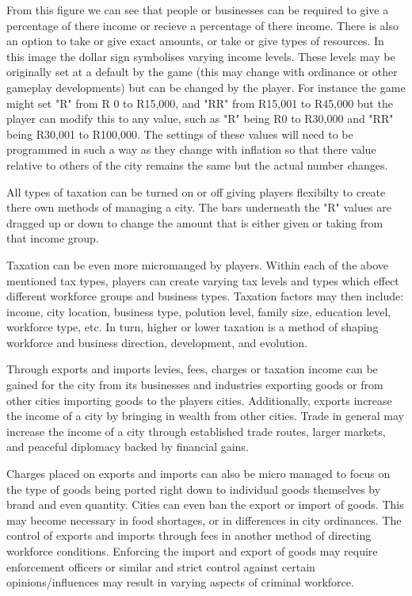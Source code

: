 
From this figure we can see that people or businesses can be required to give a percentage of there income or recieve a percentage of there income. There is also an option to take or give exact amounts, or take or give types of resources. In this image the dollar sign symbolises varying income levels. These levels may be originally set at a default by the game (this may change with ordinance or other gameplay developments) but can be changed by the player. For instance the game might set "R" from R 0 to R15,000, and "RR" from R15,001 to R45,000 but the player can modify this to any value, such as "R" being R0 to R30,000 and "RR" being R30,001 to R100,000. The settings of these values will need to be programmed in such a way as they change with inflation so that there value relative to others of the city remains the same but the actual number changes.

All types of taxation can be turned on or off giving players flexibilty to create there own methods of managing a city. The bars underneath the "R" values are dragged up or down to change the amount that is either given or taking from that income group.  


Taxation can be even more micromanged by players. Within each of the above mentioned tax types, players can create varying tax levels and types which effect different workforce groups and business types. Taxation factors may then include: income, city location, business type, polution level, family size, education level, workforce type, etc. In turn, higher or lower taxation is a method of shaping workforce and business direction, development, and evolution. 



Through exports and imports levies, fees, charges or taxation income can be gained for the city from its businesses and industries exporting goods or from other cities importing goods to the players cities. Additionally, exports increase the income of a city by bringing in wealth from other cities. Trade in general may increase the income of a city through established trade routes, larger markets, and peaceful diplomacy backed by financial gains. 

Charges placed on exports and imports can also be micro managed to focus on the type of goods being ported right down to individual goods themselves by brand and even quantity. Cities can even ban the export or import of goods. This may become necessary in food shortages, or in differences in city ordinances. The control of exports and imports through fees in another method of directing workforce conditions. Enforcing the import and export of goods may require enforcement officers or similar and strict control against certain opinions/influences may result in varying aspects of criminal workforce.


